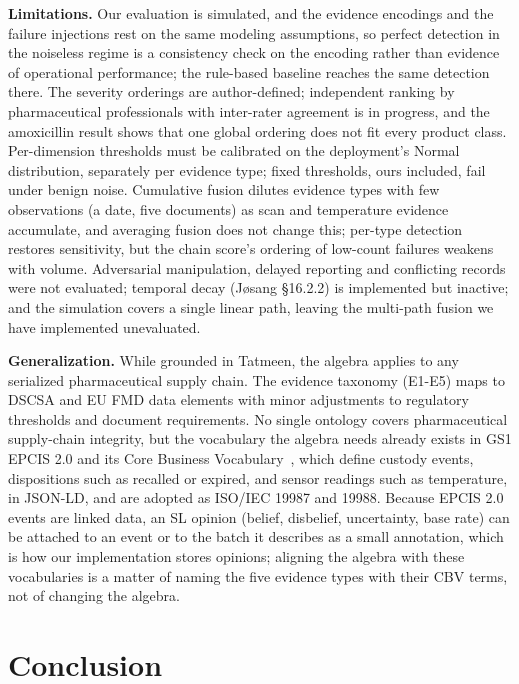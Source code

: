 \documentclass[conference]{IEEEtran}
\begin{document}
\textbf{Limitations.} Our evaluation is simulated, and the evidence
encodings and the failure injections rest on the same modeling
assumptions, so perfect detection in the noiseless regime is a
consistency check on the encoding rather than evidence of operational
performance; the rule-based baseline reaches the same detection there.
The severity orderings are author-defined; independent ranking by
pharmaceutical professionals with inter-rater agreement is in progress,
and the amoxicillin result shows that one global ordering does not fit
every product class. Per-dimension thresholds must be calibrated on the
deployment's Normal distribution, separately per evidence type; fixed
thresholds, ours included, fail under benign noise. Cumulative fusion
dilutes evidence types with few observations (a date, five documents) as
scan and temperature evidence accumulate, and averaging fusion does not
change this; per-type detection restores sensitivity, but the chain
score's ordering of low-count failures weakens with volume. Adversarial
manipulation, delayed reporting and conflicting records were not
evaluated; temporal decay (J\o sang \S16.2.2) is implemented but
inactive; and the simulation covers a single linear path, leaving the
multi-path fusion we have implemented unevaluated.

\textbf{Generalization.} While grounded in Tatmeen, the algebra applies
to any serialized pharmaceutical supply chain. The evidence taxonomy
(E1-E5) maps to DSCSA and EU FMD data elements with minor
adjustments to regulatory thresholds and document requirements. No
single ontology covers pharmaceutical supply-chain integrity, but the
vocabulary the algebra needs already exists in GS1 EPCIS 2.0 and its
Core Business Vocabulary~\cite{gs1epcis2022, gs1cbv2022}, which define
custody events, dispositions such as recalled or expired, and sensor
readings such as temperature, in JSON-LD, and are adopted as ISO/IEC
19987 and 19988. Because EPCIS 2.0 events are linked data, an SL opinion
(belief, disbelief, uncertainty, base rate) can be attached to an event
or to the batch it describes as a small annotation, which is how our
implementation stores opinions; aligning the algebra with these
vocabularies is a matter of naming the five evidence types with their
CBV terms, not of changing the algebra.

\section{Conclusion}
\end{document}
